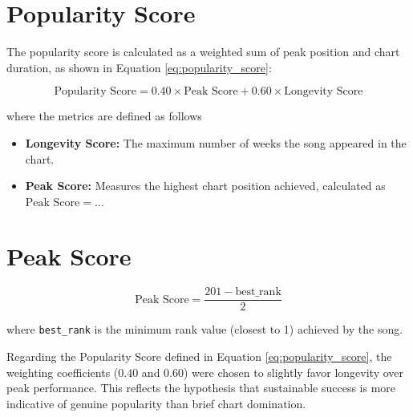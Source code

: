 \documentclass{article}
\begin{document}
{{{{{{{\section{Popularity Score}

The popularity score is calculated as a weighted sum of peak position and chart duration, as shown in Equation \ref{eq:popularity_score}:

\begin{equation}
    \text{Popularity Score} = 0.40 \times \text{Peak Score} + 0.60 \times \text{Longevity Score}
    \label{eq:popularity_score}
\end{equation}

\noindent where the metrics are defined as follows
\begin{itemize}
    \item \textbf{Longevity Score:} The maximum number of weeks the song appeared in the chart.
    \item \textbf{Peak Score:} Measures the highest chart position achieved, calculated as $ \text{Peak Score} = \dots $ %
\end{itemize}
\section{Peak Score}
\begin{equation}
    \text{Peak Score} = \frac{201 - \text{best\_rank}}{2} 
    \label{eq:peak_score}
\end{equation}

\noindent where \texttt{best\_rank} is the minimum rank value (closest to 1) achieved by the song.

Regarding the Popularity Score defined in Equation \ref{eq:popularity_score}, the weighting coefficients ($0.40$ and $0.60$) were chosen to slightly favor longevity over peak performance. This reflects the hypothesis that sustainable success is more indicative of genuine popularity than brief chart domination.
\newpage
}}}}}}}
\end{document}
